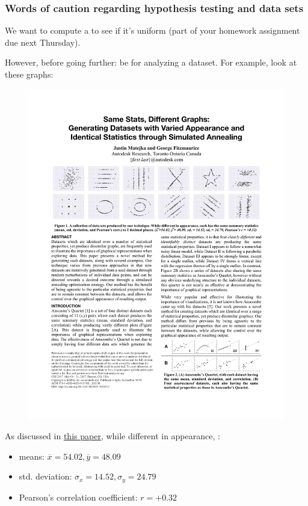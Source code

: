 \documentclass[hyperref={colorlinks=true}]{beamer}
\begin{document}
\begin{frame}[fragile]%
  \frametitle{Words of caution regarding hypothesis testing and data sets}
  
  We want to compute a \chisq to see if it's uniform (part of your homework assignment due next Thursday).
  
  However, before going further: be  for analyzing a dataset. For example, look at these graphs:
  
  \begin{figure}
    \includegraphics[width=\textwidth]{SameStatsDiffGraphs.pdf}
  \end{figure} 
  
  \pause
  
  As discussed in \href{https://www.autodeskresearch.com/publications/samestats}{this paper}, while different in appearance, :
  
  \begin{itemize}
    \item means: $\overline{x}=54.02, \overline{y}=48.09$
    \item std. deviation: $\sigma_x = 14.52, \sigma_y = 24.79$
    \item Pearson's correlation coefficient: $r = +0.32$
  \end{itemize}


\end{frame}
\end{document}
